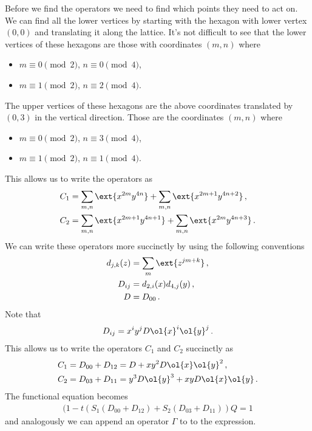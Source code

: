 Before we find the operators we need to find which points they need to act on. We can find all the lower vertices by starting with the hexagon with lower vertex $(0,0)$ and translating it along the lattice. It's not difficult to see that the lower vertices of these hexagons are those with coordinates $(m,n)$ where
\begin{itemize}
\item $m \equiv 0\pmod{2}$, $n\equiv 0 \pmod 4$,
\item $ m \equiv 1 \pmod 2$, $n \equiv 2 \pmod 4$.
\end{itemize}
The upper vertices of these hexagons are the above coordinates translated by $(0,3)$ in the vertical direction. Those are the coordinates $(m,n)$ where
\begin{itemize}
\item $m \equiv 0\pmod{2}$, $n\equiv 3 \pmod 4$,
\item $ m \equiv 1 \pmod 2$, $n \equiv 1 \pmod 4$.
\end{itemize}
This allows us to write the operators as
\begin{align}
	C_1 &= \sum_{m,n}\ext{x^{2m} y^{4n}} + \sum_{m,n}\ext{x^{2m+1} y^{4n+2}}\,,\\
	C_2 &= \sum_{m,n}\ext{x^{2m+1} y^{4n+1}} + \sum_{m,n}\ext{x^{2m} y^{4n+3}}\,.\\
\end{align}
We can write these operators more succinctly by using the following conventions
\begin{align}
	d_{j,k}(z) &= \sum_{m}\ext{z^{jm+k}}\,,\\
	D_{ij} &= d_{2,i}(x)d_{4,j}(y)\,,\\
	D &= D_{00}\,.
\end{align}
Note that
\begin{align}
	D_{ij} = x^iy^jD\ol{x}^i\ol{y}^j\,.
\end{align}
This allows us to write the operators $C_1$ and $C_2$ succinctly as
\begin{align}
	C_1 &= D_{00} + D_{12} = D + xy^2D\ol{x}\ol{y}^2\,,\\
	C_2 &= D_{03}+ D_{11} = y^3 D \ol{y}^3 +  xyD\ol{x}\ol{y}\,.
\end{align}
The functional equation becomes
\begin{align}
	(1 - t(S_1(D_{00} + D_{12})+S_2(D_{03}+D_{11}))Q = 1
\end{align}
and analogously we can append an operator $\Gamma$ to to the expression.

